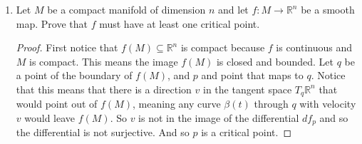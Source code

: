 \documentclass[11pt]{article}
\theoremstyle{definition}
\theoremstyle{definition}
\newcommand{\R}{{\mathbb R}}
\begin{document}
\begin{enumerate}
\begin{proof}
		So from the level set theorem we have that $F^{-1}(I)=\{UU^*=1\}=U(d)$ is a submanifold of dimension $d^2$. 
    \end{proof}

	\item Let $M$ be a compact manifold of dimension $n$ and let $f:M \to \R^n$ be a smooth map. Prove that $f$ must have at least one critical point.
	
    \begin{proof}
        First notice that $f(M)\subseteq \R^n$ is compact because $f$ is continuous and $M$ is compact. This means the image $f(M)$ is closed and bounded.
	Let $q$ be a point of the boundary of $f(M)$, and $p$ and point that maps to $q$. Notice that this means that there is a direction $v$ in the tangent space
	$T_q\R^n$ that would point out of $f(M)$, meaning any curve $\beta(t)$ through $q$ with velocity $v$ would leave $f(M)$. So $v$ is not in the image of the differential
	$df_p$ and so the differential is not surjective. And so $p$ is a critical point.
    \end{proof}
	

\end{enumerate}
\end{document}

